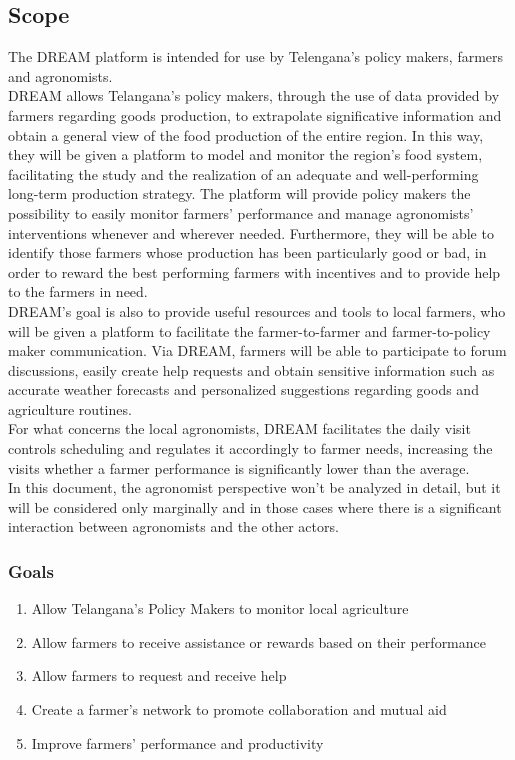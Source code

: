 \documentclass[10pt]{article}
\begin{document}
\subsection{Scope} %
The DREAM platform is intended for use by Telengana's policy makers, farmers and agronomists.\\
DREAM allows Telangana's policy makers, through the use of data provided by farmers regarding goods 
production, to extrapolate significative information and obtain a general view of the food production of the entire region. 
In this way, they will be given a platform to model and monitor the region's food system, facilitating the study and the 
realization of an adequate and well-performing long-term production strategy. The platform will provide policy makers the possibility 
to easily monitor farmers' performance and manage agronomists' interventions whenever and wherever needed. 
Furthermore, they will be able to identify those farmers whose production has been particularly good or bad,
in order to reward the best performing farmers with incentives and to provide help to the farmers in need.\\ 
DREAM's goal is also to provide useful resources and tools to local farmers, who will be given a platform to facilitate 
the farmer-to-farmer and farmer-to-policy maker communication. Via DREAM, farmers will be able to participate to forum
discussions, easily create help requests and obtain sensitive information such as accurate weather forecasts and personalized 
suggestions regarding goods and agriculture routines.\\
For what concerns the local agronomists, DREAM facilitates the daily visit controls scheduling and regulates it accordingly
to farmer needs, increasing the visits whether a farmer performance is significantly lower than the average.\\
In this document, the agronomist perspective won't be analyzed in detail, but it will be considered only marginally and in those
cases where there is a significant interaction between agronomists and the other actors.
\subsubsection{Goals}
\begin{enumerate}[label=\textbf{G\arabic*}]
    \item \label{goal:g1} Allow Telangana's Policy Makers to monitor local agriculture
    \item \label{goal:g2} Allow farmers to receive assistance or rewards based on their performance
    \item \label{goal:g3} Allow farmers to request and receive help
    \item \label{goal:g4} Create a farmer's network to promote collaboration and mutual aid 
    \item \label{goal:g5} Improve farmers' performance and productivity
\end{enumerate}
\end{document}
